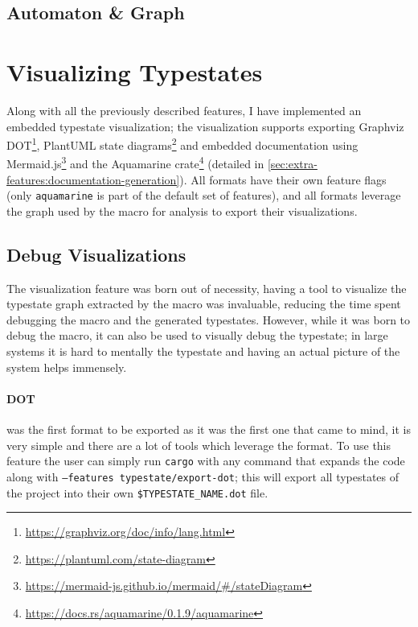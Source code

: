 \subsection{Automaton \& Graph}\label{sec:validation:automaton}

\section{Visualizing Typestates}\label{sec:extra-features:automata-visualization}

Along with all the previously described features, I have implemented an embedded typestate visualization;
the visualization supports exporting Graphviz DOT\footnote{\url{https://graphviz.org/doc/info/lang.html}},
PlantUML state diagrams\footnote{\url{https://plantuml.com/state-diagram}} and
embedded documentation using Mermaid.js\footnote{\url{https://mermaid-js.github.io/mermaid/\#/stateDiagram}}
and the Aquamarine crate\footnote{\url{https://docs.rs/aquamarine/0.1.9/aquamarine}} (detailed in \autoref{sec:extra-features:documentation-generation}).
All formats have their own feature flags (only \texttt{aquamarine} is part of the default set of features),
and all formats leverage the graph used by the macro for analysis to export their visualizations.

\subsection{Debug Visualizations}

The visualization feature was born out of necessity,
having a tool to visualize the typestate graph extracted by the macro was invaluable,
reducing the time spent debugging the macro and the generated typestates.
However, while it was born to debug the macro, it can also be used to visually debug the typestate;
in large systems it is hard to mentally  the typestate and having an actual picture of the system helps immensely.

\paragraph{DOT} was the first format to be exported as it was the first one that came to mind,
it is very simple and there are a lot of tools which leverage the format.
To use this feature the user can simply run \texttt{cargo} with any command that expands the code along with \texttt{--features typestate/export-dot};
this will export all typestates of the project into their own \texttt{\$TYPESTATE\_NAME.dot} file.

